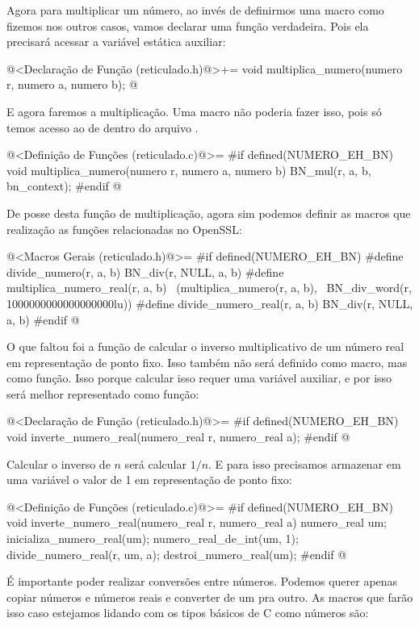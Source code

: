 Agora para multiplicar um número, ao invés de definirmos uma macro
como fizemos nos outros casos, vamos declarar uma função
verdadeira. Pois ela precisará acessar a variável estática auxiliar:

\iniciocodigo
@<Declaração de Função (reticulado.h)@>+=
void multiplica_numero(numero r, numero a, numero b);
@
\fimcodigo

E agora faremos a multiplicação. Uma macro não poderia fazer isso,
pois só temos acesso ao  de dentro do
arquivo .

\iniciocodigo
@<Definição de Funções (reticulado.c)@>=
#if defined(NUMERO_EH_BN)
void multiplica_numero(numero r, numero a, numero b){
  BN_mul(r, a, b, bn_context);
}
#endif
@

De posse desta função de multiplicação, agora sim podemos definir as
macros que realização as funções relacionadas no OpenSSL:

\iniciocodigo
@<Macros Gerais (reticulado.h)@>=
#if defined(NUMERO_EH_BN)
#define divide_numero(r, a, b) BN_div(r, NULL, a, b)
#define multiplica_numero_real(r, a, b)  \
        (multiplica_numero(r, a, b),    \
         BN_div_word(r, 1000000000000000000lu))
#define divide_numero_real(r, a, b) BN_div(r, NULL, a, b)
#endif
@
\fimcodigo

O que faltou foi a função de calcular o inverso multiplicativo de um
número real em representação de ponto fixo. Isso também não será
definido como macro, mas como função. Isso porque calcular isso requer
uma variável auxiliar, e por isso será melhor representado como
função:

\iniciocodigo
@<Declaração de Função (reticulado.h)@>=
#if defined(NUMERO_EH_BN)
void inverte_numero_real(numero_real r, numero_real a);
#endif
@
\fimcodigo

Calcular o inverso de $n$ será calcular $1/n$. E para isso precisamos
armazenar em uma variável o valor de 1 em representação de ponto fixo:

\iniciocodigo
@<Definição de Funções (reticulado.c)@>=
#if defined(NUMERO_EH_BN)
void inverte_numero_real(numero_real r, numero_real a){
  numero_real um;
  inicializa_numero_real(um);
  numero_real_de_int(um, 1);
  divide_numero_real(r, um, a);
  destroi_numero_real(um);
}
#endif
@
\fimcodigo

É importante poder realizar conversões entre números. Podemos querer
apenas copiar números e números reais e converter de um pra outro. As
macros que farão isso caso estejamos lidando com os tipos básicos de C
como números são:

